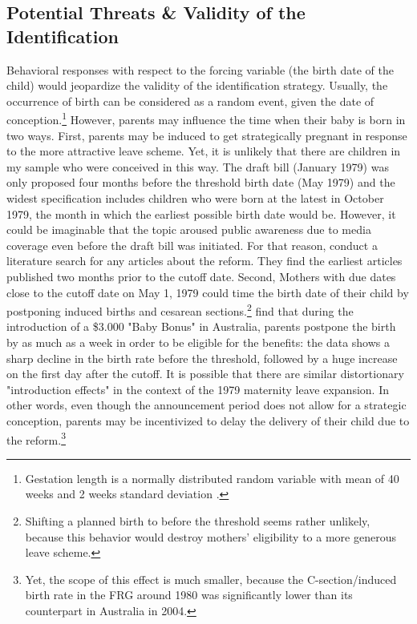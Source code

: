 \documentclass[11pt, a4paper,draft]{article} %
\begin{document}
\subsection{Potential Threats \& Validity of the Identification}\label{sec:empirical_strategy_threats+validity}
Behavioral responses with respect to the forcing variable (the birth date of the child) would jeopardize the validity of the identification strategy. Usually, the occurrence of birth can be considered as a random event, given the date of conception.\footnote{Gestation length is a normally distributed random variable with mean of 40 weeks and 2 weeks standard deviation \citep{Ekberg2013parental}.} However, parents may influence the time when their baby is born in two ways. \newline
First, parents may be induced to get strategically pregnant in response to the more attractive leave scheme. Yet, it is unlikely that there are children in my sample who were conceived in this way. The draft bill (January 1979) was only proposed four months before the threshold birth date (May 1979) and the widest specification includes children who were born at the latest in October 1979, the month in which the earliest possible birth date would be. However, it could be imaginable that the topic aroused public awareness due to media coverage even before the draft bill was initiated. For that reason, \cite{Dustmann2012} conduct a literature search for any articles about the reform. They find the earliest articles published two months prior to the cutoff date.\newline
Second, Mothers with due dates close to the cutoff date on May 1, 1979 could time the birth date of their child by postponing induced births and cesarean sections.\footnote{Shifting a planned birth to before the threshold seems rather unlikely, because this behavior would destroy mothers' eligibility to a more generous leave scheme.} \cite{gans2009born} find that during the introduction of a \$3.000 "Baby Bonus" in Australia, parents postpone the birth by as much as a week in order to be eligible for the benefits: the data shows a sharp decline in the birth rate before the threshold, followed by a huge increase on the first day after the cutoff.\newline
It is possible that there are similar distortionary "introduction effects" in the context of the 1979 maternity leave expansion. In other words, even though the announcement period does not allow for a strategic conception, parents may be incentivized to delay the delivery of their child due to the reform.\footnote{Yet, the scope of this effect is much smaller, because the C-section/induced birth rate in the FRG around 1980 was significantly lower than its counterpart in Australia in 2004.} \newline %
\end{document}
